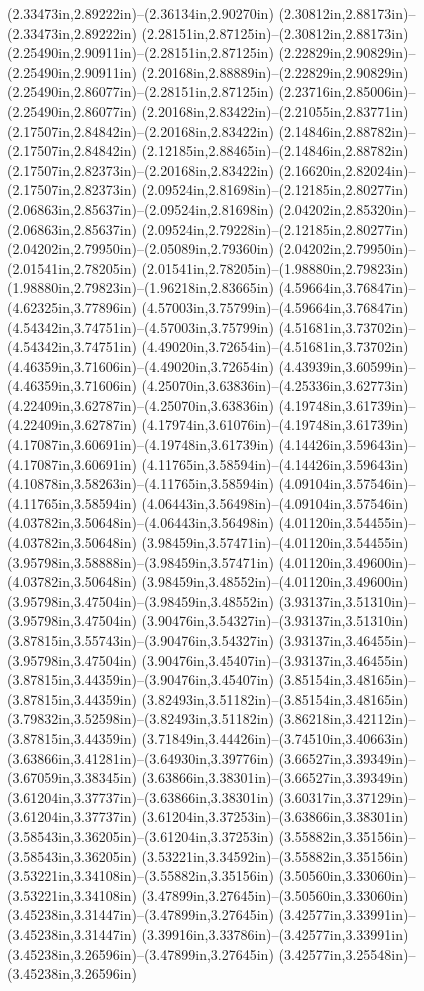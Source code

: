 (2.33473in,2.89222in)--(2.36134in,2.90270in) (2.30812in,2.88173in)--(2.33473in,2.89222in) (2.28151in,2.87125in)--(2.30812in,2.88173in) (2.25490in,2.90911in)--(2.28151in,2.87125in) (2.22829in,2.90829in)--(2.25490in,2.90911in) (2.20168in,2.88889in)--(2.22829in,2.90829in) (2.25490in,2.86077in)--(2.28151in,2.87125in) (2.23716in,2.85006in)--(2.25490in,2.86077in) (2.20168in,2.83422in)--(2.21055in,2.83771in) (2.17507in,2.84842in)--(2.20168in,2.83422in) (2.14846in,2.88782in)--(2.17507in,2.84842in) (2.12185in,2.88465in)--(2.14846in,2.88782in) (2.17507in,2.82373in)--(2.20168in,2.83422in) (2.16620in,2.82024in)--(2.17507in,2.82373in) (2.09524in,2.81698in)--(2.12185in,2.80277in) (2.06863in,2.85637in)--(2.09524in,2.81698in) (2.04202in,2.85320in)--(2.06863in,2.85637in) (2.09524in,2.79228in)--(2.12185in,2.80277in) (2.04202in,2.79950in)--(2.05089in,2.79360in) (2.04202in,2.79950in)--(2.01541in,2.78205in) (2.01541in,2.78205in)--(1.98880in,2.79823in) (1.98880in,2.79823in)--(1.96218in,2.83665in) (4.59664in,3.76847in)--(4.62325in,3.77896in) (4.57003in,3.75799in)--(4.59664in,3.76847in) (4.54342in,3.74751in)--(4.57003in,3.75799in) (4.51681in,3.73702in)--(4.54342in,3.74751in) (4.49020in,3.72654in)--(4.51681in,3.73702in) (4.46359in,3.71606in)--(4.49020in,3.72654in) (4.43939in,3.60599in)--(4.46359in,3.71606in) (4.25070in,3.63836in)--(4.25336in,3.62773in) (4.22409in,3.62787in)--(4.25070in,3.63836in) (4.19748in,3.61739in)--(4.22409in,3.62787in) (4.17974in,3.61076in)--(4.19748in,3.61739in) (4.17087in,3.60691in)--(4.19748in,3.61739in) (4.14426in,3.59643in)--(4.17087in,3.60691in) (4.11765in,3.58594in)--(4.14426in,3.59643in) (4.10878in,3.58263in)--(4.11765in,3.58594in) (4.09104in,3.57546in)--(4.11765in,3.58594in) (4.06443in,3.56498in)--(4.09104in,3.57546in) (4.03782in,3.50648in)--(4.06443in,3.56498in) (4.01120in,3.54455in)--(4.03782in,3.50648in) (3.98459in,3.57471in)--(4.01120in,3.54455in) (3.95798in,3.58888in)--(3.98459in,3.57471in) (4.01120in,3.49600in)--(4.03782in,3.50648in) (3.98459in,3.48552in)--(4.01120in,3.49600in) (3.95798in,3.47504in)--(3.98459in,3.48552in) (3.93137in,3.51310in)--(3.95798in,3.47504in) (3.90476in,3.54327in)--(3.93137in,3.51310in) (3.87815in,3.55743in)--(3.90476in,3.54327in) (3.93137in,3.46455in)--(3.95798in,3.47504in) (3.90476in,3.45407in)--(3.93137in,3.46455in) (3.87815in,3.44359in)--(3.90476in,3.45407in) (3.85154in,3.48165in)--(3.87815in,3.44359in) (3.82493in,3.51182in)--(3.85154in,3.48165in) (3.79832in,3.52598in)--(3.82493in,3.51182in) (3.86218in,3.42112in)--(3.87815in,3.44359in) (3.71849in,3.44426in)--(3.74510in,3.40663in) (3.63866in,3.41281in)--(3.64930in,3.39776in) (3.66527in,3.39349in)--(3.67059in,3.38345in) (3.63866in,3.38301in)--(3.66527in,3.39349in) (3.61204in,3.37737in)--(3.63866in,3.38301in) (3.60317in,3.37129in)--(3.61204in,3.37737in) (3.61204in,3.37253in)--(3.63866in,3.38301in) (3.58543in,3.36205in)--(3.61204in,3.37253in) (3.55882in,3.35156in)--(3.58543in,3.36205in) (3.53221in,3.34592in)--(3.55882in,3.35156in) (3.53221in,3.34108in)--(3.55882in,3.35156in) (3.50560in,3.33060in)--(3.53221in,3.34108in) (3.47899in,3.27645in)--(3.50560in,3.33060in) (3.45238in,3.31447in)--(3.47899in,3.27645in) (3.42577in,3.33991in)--(3.45238in,3.31447in) (3.39916in,3.33786in)--(3.42577in,3.33991in) (3.45238in,3.26596in)--(3.47899in,3.27645in) (3.42577in,3.25548in)--(3.45238in,3.26596in) 